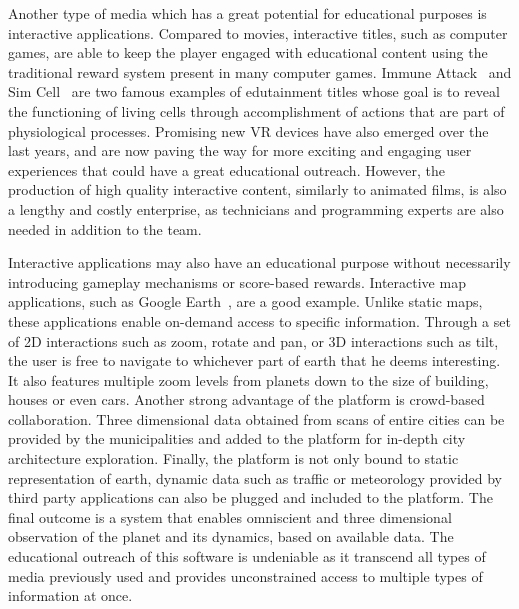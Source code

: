 Another type of media which has a great potential for educational purposes is interactive applications.
Compared to movies, interactive titles, such as computer games, are able to keep the player engaged with educational content using the traditional reward system present in many computer games.
Immune Attack~\cite{immune2008} and Sim Cell~\cite{simcell2013} are two famous examples of edutainment titles whose goal is to reveal the functioning of living cells through accomplishment of actions that are part of physiological processes.
Promising new VR devices have also emerged over the last years, and are now paving the way for more exciting and engaging user experiences that could have a great educational outreach.
However, the production of high quality interactive content, similarly to animated films, is also a lengthy and costly enterprise, as technicians and programming experts are also needed in addition to the team.

Interactive applications may also have an educational purpose without necessarily introducing gameplay mechanisms or score-based rewards. 
Interactive map applications, such as Google Earth~\cite{gearth2001}, are a good example.
Unlike static maps, these applications enable on-demand access to specific information.
Through a set of 2D interactions such as zoom, rotate and pan, or 3D interactions such as tilt, the user is free to navigate to whichever part of earth that he deems interesting.
It also features multiple zoom levels from planets down to the size of building, houses or even cars.
Another strong advantage of the platform is crowd-based collaboration.
Three dimensional data obtained from scans of entire cities can be provided by the municipalities and added to the platform for in-depth city architecture exploration.
Finally, the platform is not only bound to static representation of earth, dynamic data such as traffic or meteorology provided by third party applications can also be plugged and included to the platform.
The final outcome is a system that enables omniscient and three dimensional observation of the planet and its dynamics, based on available data.
The educational outreach of this software is undeniable as it transcend all types of media previously used and provides unconstrained access to multiple types of information at once. 

